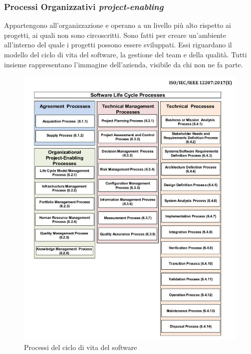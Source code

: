 		\subsubsection{Processi Organizzativi \textit{project-enabling}}
		Appartengono all'organizzazione e operano a un livello più alto rispetto ai progetti, ai quali non sono circoscritti. Sono fatti per creare un'ambiente all'interno del quale i progetti possono essere sviluppati. Essi riguardano il modello del ciclo di vita del software, la gestione del team e della qualità. Tutti insieme rappresentano l'immagine dell'azienda, visibile da chi non ne fa parte.
		
		\begin{figure}
			\centering
			\includegraphics[scale=0.5]{res/images/software_life_cycle_processes.jpg}\caption{Processi del ciclo di vita del software}	
		\end{figure}
	
